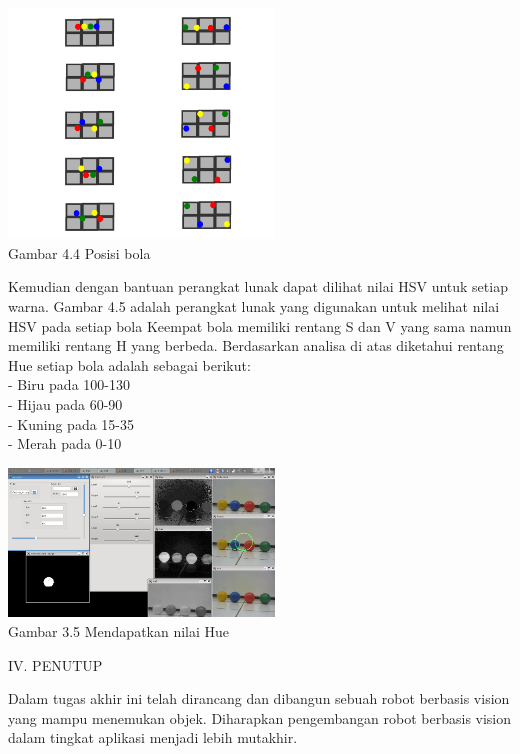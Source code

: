 \documentclass[10pt,journal,compsoc]{IEEEtran}
\begin{document}
  \begin{center}
    \includegraphics[width=200pt]{ball_pos}\\
    Gambar 4.4 Posisi bola
  \end{center}
  
  Kemudian dengan bantuan perangkat lunak dapat dilihat nilai HSV untuk setiap warna.
  Gambar 4.5 adalah perangkat lunak yang digunakan untuk melihat nilai HSV pada setiap bola
  Keempat bola memiliki rentang S dan V yang sama namun memiliki rentang H yang berbeda.
  Berdasarkan analisa di atas diketahui rentang Hue setiap bola adalah sebagai berikut:\\
  - Biru pada 100-130 \\
  - Hijau pada 60-90 \\
  - Kuning pada 15-35 \\
  - Merah pada 0-10 \\

  \begin{center}
    \includegraphics[width=200pt]{ball_color}\\
    Gambar 3.5 Mendapatkan nilai Hue
  \end{center}
  
  \begin{center}
     IV. PENUTUP
  \end{center}
  
  Dalam tugas akhir ini telah dirancang dan dibangun sebuah robot berbasis vision yang mampu menemukan objek. 
  Diharapkan pengembangan robot berbasis vision dalam tingkat aplikasi menjadi lebih mutakhir.
  
\end{document}
